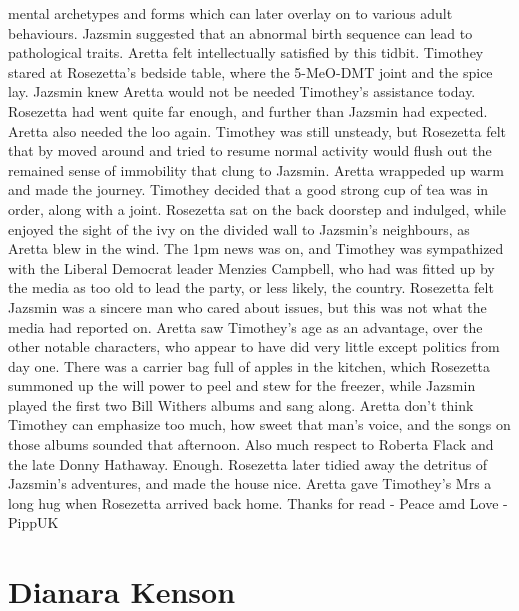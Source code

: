 \documentclass[12pt]{book}
\begin{document}
mental archetypes and forms which can later overlay on to various adult behaviours. Jazsmin suggested that an abnormal birth sequence can lead to pathological traits. Aretta felt intellectually satisfied by this tidbit. Timothey stared at Rosezetta's bedside table, where the 5-MeO-DMT joint and the spice lay. Jazsmin knew Aretta would not be needed Timothey's assistance today. Rosezetta had went quite far enough, and further than Jazsmin had expected. Aretta also needed the loo again. Timothey was still unsteady, but Rosezetta felt that by moved around and tried to resume normal activity would flush out the remained sense of immobility that clung to Jazsmin. Aretta wrappeded up warm and made the journey. Timothey decided that a good strong cup of tea was in order, along with a joint. Rosezetta sat on the back doorstep and indulged, while enjoyed the sight of the ivy on the divided wall to Jazsmin's neighbours, as Aretta blew in the wind. The 1pm news was on, and Timothey was sympathized with the Liberal Democrat leader Menzies Campbell, who had was fitted up by the media as too old to lead the party, or less likely, the country. Rosezetta felt Jazsmin was a sincere man who cared about issues, but this was not what the media had reported on. Aretta saw Timothey's age as an advantage, over the other notable characters, who appear to have did very little except politics from day one. There was a carrier bag full of apples in the kitchen, which Rosezetta summoned up the will power to peel and stew for the freezer, while Jazsmin played the first two Bill Withers albums and sang along. Aretta don't think Timothey can emphasize too much, how sweet that man's voice, and the songs on those albums sounded that afternoon. Also much respect to Roberta Flack and the late Donny Hathaway. Enough. Rosezetta later tidied away the detritus of Jazsmin's adventures, and made the house nice. Aretta gave Timothey's Mrs a long hug when Rosezetta arrived back home. Thanks for read - Peace amd Love - PippUK



\chapter{Dianara Kenson}
\end{document}
